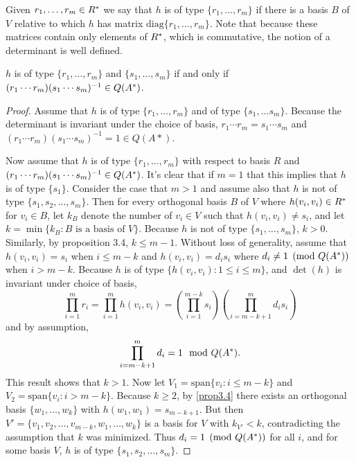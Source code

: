 Given $r_1, \dotsc, r_m \in R^*$ we say that $h$ is of type $\{r_1, \dotsc, r_m \}$ if there is a basis $B$ of $V$ relative to which $h$ has matrix $\text{diag} \{r_1, \dotsc, r_m \}$.
Note that because these matrices contain only elements of $R^*$, which is commutative, the notion of a determinant is well defined.

\begin{lemma}\label{extralemma1}
$h$ is of type $\{r_1, \dotsc, r_m \}$ and $\{s_1, \dotsc, s_m \}$ if and only if \newline $(r_1 \dotsb r_m)(s_1 \dotsb s_m)^{-1} \in Q(A^*)$.
\end{lemma}

\begin{proof}
Assume that $h$ is of type $\{r_1, \dotsc, r_m\}$ and of type $\{s_1, \dotsc s_m \}$. Because the determinant is invariant under the choice of basis, $r_1 \dotsb r_m = s_1 \dotsb s_m$ and $(r_1 \dotsb r_m)(s_1 \dotsb s_m)^{-1} = 1 \in Q(A*)$.

Now assume that $h$ is of type $\{r_1, \dotsc, r_m \}$ with respect to basis $R$ and $(r_1 \dotsb r_m)(s_1 \dotsb s_m)^{-1} \in Q(A^*)$.
It's clear that if $m = 1$ that this implies that $h$ is of type $\{s_1 \}$.
Consider the case that $m > 1$ and assume also that $h$ is not of type $\{s_1, s_2, \dotsc, s_m \}$.
Then for every orthogonal basis $B$ of $V$ where $h(v_i, v_i) \in R^*$ for $v_i \in B$, let $k_B$ denote the number of $v_i \in V$ such that $h(v_i, v_i) \ne s_i$, and let $k = \min \{k_B : B \text{ is a basis of } V \}$.
Because $h$ is not of type $\{s_1, \dotsc, s_m \}$, $k > 0$.
Similarly, by proposition 3.4, $k \leqslant m - 1$.
Without loss of generality, assume that $h(v_i, v_i) = s_i$ when $i \leqslant m - k$ and $h(v_i, v_i) = d_i s_i$ where $d_i \ne 1 \pmod{Q(A^*)}$ when $i > m - k$.
Because $h$ is of type $\{h(v_i,v_i): 1 \le i \le m \}$, and $\det(h)$ is invariant under choice of basis,
\[
\prod_{i=1}^m r_i = \prod_{i=1}^m h(v_i, v_i) = \left(\prod_{i=1}^{m - k} s_i \right) \left( \prod_{i=m-k+1}^m d_i s_i \right)
\]
and by assumption,
\[
\prod_{i=m-k+1}^m d_i = 1 \mod{Q(A^*)}.
\]
This result shows that $k > 1$.
Now let $V_1 = \text{span}\{v_i: i \le m - k\}$ and $V_2 = \text{span}\{v_i: i > m - k\}$.
Because $k \ge 2$, by \cref{prop3.4} there exists an orthogonal basis $\{w_1, \dotsc, w_k \}$ with $h(w_1, w_1) = s_{m - k + 1}$.
But then $V' = \{v_1, v_2, \dotsc, v_{m-k}, w_1, \dotsc, w_k \}$ is a basis for $V$ with $k_{V'} < k$, contradicting the assumption that $k$ was minimized.
Thus $d_i = 1 \pmod{Q(A^*)}$ for all $i$, and for some basis $V$, $h$ is of type $\{s_1, s_2, \dotsc, s_m\}$.
\end{proof}

